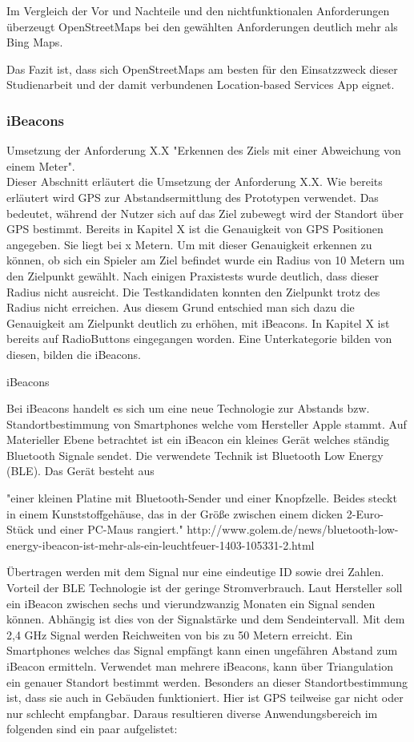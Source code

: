 Im Vergleich der Vor und Nachteile und den nichtfunktionalen Anforderungen überzeugt OpenStreetMaps bei den gewählten Anforderungen deutlich mehr als Bing Maps.

Das Fazit ist, dass sich OpenStreetMaps am besten für den Einsatzzweck dieser Studienarbeit und der damit verbundenen Location-based Services App eignet.

\subsubsection{iBeacons}
Umsetzung der Anforderung X.X "Erkennen des Ziels mit einer Abweichung von einem Meter".
\\Dieser Abschnitt erläutert die Umsetzung der Anforderung X.X. Wie bereits erläutert wird GPS zur Abstandsermittlung des Prototypen verwendet. Das bedeutet, während der Nutzer sich auf das Ziel zubewegt wird der Standort über GPS bestimmt. Bereits in Kapitel X ist die Genauigkeit von GPS Positionen angegeben.  Sie liegt bei x Metern. Um mit dieser Genauigkeit erkennen zu können, ob sich ein Spieler am Ziel befindet wurde ein Radius von 10 Metern um den Zielpunkt gewählt. Nach einigen Praxistests wurde deutlich, dass dieser Radius nicht ausreicht. Die Testkandidaten konnten den Zielpunkt trotz des Radius nicht erreichen. Aus diesem Grund entschied man sich dazu die Genauigkeit am Zielpunkt deutlich zu erhöhen, mit iBeacons. In Kapitel X ist bereits auf RadioButtons eingegangen worden. Eine Unterkategorie bilden von diesen, bilden die iBeacons.

iBeacons

Bei iBeacons handelt es sich um eine neue Technologie zur Abstands bzw. Standortbestimmung von Smartphones welche vom Hersteller Apple stammt. Auf Materieller Ebene betrachtet ist ein iBeacon ein kleines Gerät welches ständig Bluetooth Signale sendet. Die verwendete Technik ist Bluetooth Low Energy (BLE). Das Gerät besteht aus

"einer kleinen Platine mit Bluetooth-Sender und einer Knopfzelle. Beides steckt in einem Kunststoffgehäuse, das in der Größe zwischen einem dicken 2-Euro-Stück und einer PC-Maus rangiert."
http://www.golem.de/news/bluetooth-low-energy-ibeacon-ist-mehr-als-ein-leuchtfeuer-1403-105331-2.html

Übertragen werden mit dem Signal nur eine eindeutige ID sowie drei Zahlen. Vorteil der BLE Technologie ist der geringe Stromverbrauch. Laut Hersteller soll ein iBeacon zwischen sechs und vierundzwanzig Monaten ein Signal senden können. Abhängig ist dies von der Signalstärke und dem Sendeintervall. Mit dem 2,4 GHz Signal werden Reichweiten von bis zu 50 Metern erreicht. Ein Smartphones welches das Signal empfängt kann einen ungefähren Abstand zum iBeacon ermitteln. Verwendet man mehrere iBeacons, kann über Triangulation ein genauer Standort bestimmt werden. Besonders an dieser Standortbestimmung ist, dass sie auch in Gebäuden funktioniert. Hier ist GPS teilweise gar nicht oder nur schlecht empfangbar. Daraus resultieren diverse Anwendungsbereich im folgenden sind ein paar aufgelistet:

